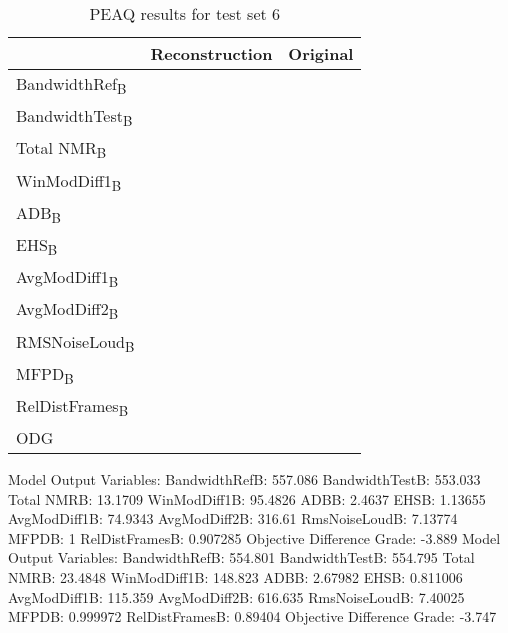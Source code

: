 \begin{table}\begin{center}
\caption{PEAQ results for test set 6}
\label{tab:PEAQdata1}
\begin{tabular}{|l|c|c|}
  \hline
                                    & Reconstruction & Original \\ \hline
  BandwidthRef\textsubscript{B}     &                & \\
  BandwidthTest\textsubscript{B}    &                & \\
  Total NMR\textsubscript{B}        &                & \\
  WinModDiff1\textsubscript{B}      &                & \\
  ADB\textsubscript{B}              &                & \\
  EHS\textsubscript{B}              &                & \\
  AvgModDiff1\textsubscript{B}      &                & \\
  AvgModDiff2\textsubscript{B}      &                & \\
  RMSNoiseLoud\textsubscript{B}     &                & \\
  MFPD\textsubscript{B}             &                & \\
  RelDistFrames\textsubscript{B}    &                & \\
  ODG                               &                & \\
  \hline
\end{tabular}
\end{center}\end{table}

Model Output Variables:
   BandwidthRefB: 557.086
  BandwidthTestB: 553.033
      Total NMRB: 13.1709
    WinModDiff1B: 95.4826
            ADBB: 2.4637
            EHSB: 1.13655
    AvgModDiff1B: 74.9343
    AvgModDiff2B: 316.61
   RmsNoiseLoudB: 7.13774
           MFPDB: 1
  RelDistFramesB: 0.907285
Objective Difference Grade: -3.889
Model Output Variables:
   BandwidthRefB: 554.801
  BandwidthTestB: 554.795
      Total NMRB: 23.4848
    WinModDiff1B: 148.823
            ADBB: 2.67982
            EHSB: 0.811006
    AvgModDiff1B: 115.359
    AvgModDiff2B: 616.635
   RmsNoiseLoudB: 7.40025
           MFPDB: 0.999972
  RelDistFramesB: 0.89404
Objective Difference Grade: -3.747


